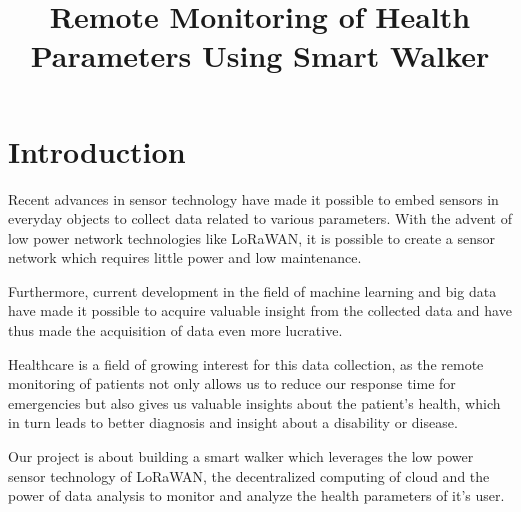 \documentclass[conference]{IEEEtran}
\begin{document}
\title{Remote Monitoring of Health Parameters Using Smart Walker}

\author{
\and
{}
\and
{}
}

\maketitle

\section{Introduction}

Recent advances in sensor technology have made it possible to embed sensors in everyday objects to collect data related to various parameters. With the advent of low power network technologies like LoRaWAN, it is possible to create a sensor network which requires little power and low maintenance.

Furthermore, current development in the field of machine learning and big data have made it possible to acquire valuable insight from the collected data and have thus made the acquisition of data even more lucrative.

Healthcare is a field of growing interest for this data collection, as the remote monitoring of patients not only allows us to reduce our response time for emergencies but also gives us valuable insights about the patient's health, which in turn leads to better diagnosis and insight about a disability or disease.

Our project is about building a smart walker which leverages the low power sensor technology of LoRaWAN, the decentralized computing of cloud and the power of data analysis to monitor and analyze the health parameters of it's user.
\end{document}
